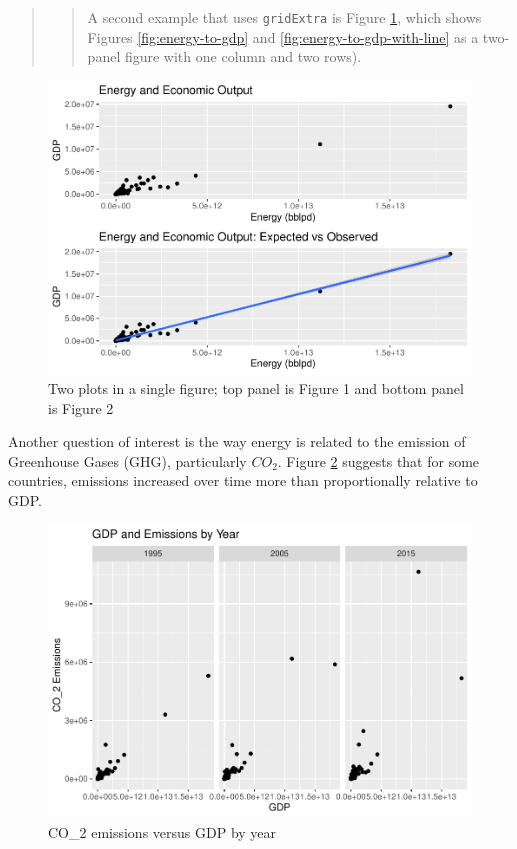 \documentclass[]{elsarticle} %
\makeatletter
\def\maxwidth{\ifdim\Gin@nat@width>\linewidth\linewidth
\else\Gin@nat@width\fi}
\let\Oldincludegraphics\includegraphics
\renewcommand{\includegraphics}[1]{\Oldincludegraphics[width=\maxwidth]{#1}}
\makeatother
\begin{document}
\begin{quote}
\begin{quote}
A second example that uses \texttt{gridExtra} is Figure
\ref{fig:top-bottom-panel-plot}, which shows Figures
\ref{fig:energy-to-gdp} and \ref{fig:energy-to-gdp-with-line} as a
two-panel figure with one column and two rows).
\end{quote}
\end{quote}

\begin{figure}
\centering
\includegraphics{Elsevier-Template_files/figure-latex/fig-top-bottom-panel-plot-1.pdf}
\caption{\label{fig:top-bottom-panel-plot} Two plots in a single figure;
top panel is Figure 1 and bottom panel is Figure 2}
\end{figure}

Another question of interest is the way energy is related to the
emission of Greenhouse Gases (GHG), particularly \(CO_2\). Figure
\ref{fig:gdp-emissions-by-year} suggests that for some countries,
emissions increased over time more than proportionally relative to GDP.

\begin{figure}
\centering
\includegraphics{Elsevier-Template_files/figure-latex/fig-gdp-emissions-by-year-1.pdf}
\caption{\label{fig:gdp-emissions-by-year} CO\_2 emissions versus GDP by
year}
\end{figure}
\end{document}
